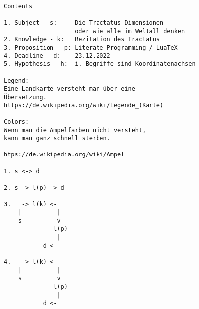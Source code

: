 \documentclass[10pt,a4paper]{article}
\begin{document}
\begin{verbatim}

Contents

1. Subject - s:     Die Tractatus Dimensionen
                    oder wie alle im Weltall denken
2. Knowledge - k:   Rezitation des Tractatus
3. Proposition - p: Literate Programming / LuaTeX
4. Deadline - d:    23.12.2022
5. Hypothesis - h:  i. Begriffe sind Koordinatenachsen

Legend:
Eine Landkarte versteht man über eine
Übersetzung.
https://de.wikipedia.org/wiki/Legende_(Karte)

Colors:
Wenn man die Ampelfarben nicht versteht,
kann man ganz schnell sterben.

htps://de.wikipedia.org/wiki/Ampel

1. s <-> d

2. s -> l(p) -> d

3.   -> l(k) <-
    |          |
    s          v
              l(p)
               |
           d <-

4.   -> l(k) <-
    |          |
    s          v
              l(p)
               |
           d <-

\end{verbatim}
\end{document}
